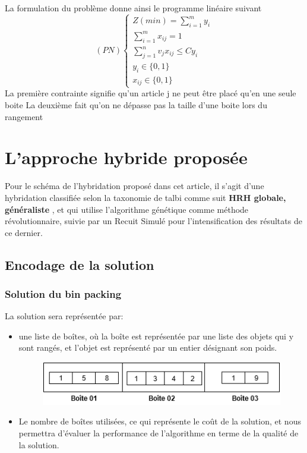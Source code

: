\documentclass[preprint]{elsarticle}
\begin{document}
La formulation du problème donne ainsi le programme linéaire suivant
\[(PN)
    \begin{cases}
        Z(min) = \displaystyle\sum_{i=1}^{m} y_i \\
        \displaystyle\sum_{i=1}^{m} x_{ij}  = 1 \\
        \displaystyle\sum_{j=1}^{n} v_j x_{ij} \le C y_i \\
        y_i \in \{0,1\} \\
        x_{ij} \in \{0,1\} 
    \end{cases}
\]  
La première contrainte signifie qu’un article j ne peut être placé qu’en une seule boite
La deuxième fait qu’on ne dépasse pas la taille d’une boite lors du rangement

\section{L'approche hybride proposée}
Pour le schéma de l’hybridation proposé dans cet article, il s’agit d’une hybridation classifiée selon la taxonomie de talbi\cite{talbi2002taxonomy} comme suit 
\textbf{HRH globale, généraliste }, et qui utilise l'algorithme génétique comme méthode révolutionnaire,
suivie par un  Recuit Simulé pour l'intensification des résultats de ce dernier.

\subsection{Encodage de la solution}
\subsubsection{Solution du bin packing}
La solution sera représentée par: 
\begin{itemize}
    \item une liste de boîtes, où la boîte est représentée par une liste des objets qui y sont rangés, et l’objet est représenté par un entier désignant son poids.
    \begin{figure}[h!]
        \centering
        \includegraphics[scale=0.6]{./figures/Untitled Diagram(6).png}
    \end{figure}
    \item Le nombre de boîtes utilisées, ce qui représente le coût de la solution, et nous permettra  d’évaluer la performance de l’algorithme en terme de la qualité de la solution.

\end{itemize}
\end{document}
